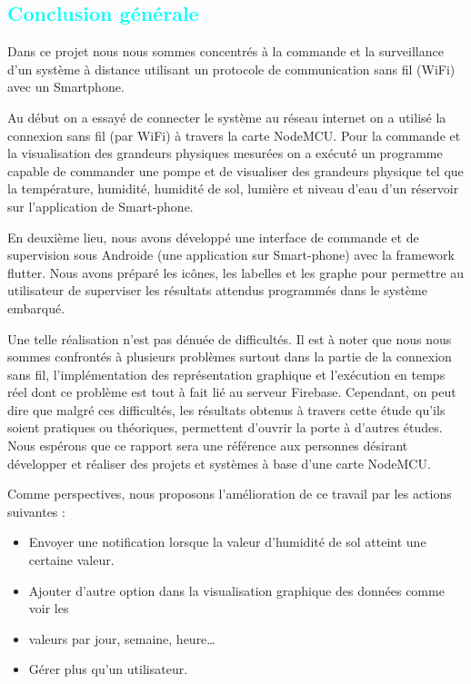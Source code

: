 
\begin{flushleft}
	\section*{\textcolor{cyan}{Conclusion générale}}
	Dans ce projet nous nous sommes concentrés à la commande et la surveillance d'un système à distance utilisant un protocole de communication sans fil (WiFi) avec un Smartphone.\newline
	
	Au début on a essayé de connecter le système au réseau internet on a utilisé la connexion sans fil (par WiFi) à travers la carte NodeMCU. Pour la commande et la visualisation des grandeurs 
	physiques mesurées on a exécuté un programme capable de commander une pompe et de 
	visualiser des grandeurs physique tel que la température, humidité, humidité de sol, lumière et 
	niveau d’eau d’un réservoir sur l’application de Smart-phone.\newline
	
	En deuxième lieu, nous avons développé une interface de commande et de supervision sous Androide (une application sur Smart-phone) avec la framework flutter. Nous 
	avons préparé les icônes, les labelles et les graphe pour permettre au utilisateur de superviser 
	les résultats attendus programmés dans le système embarqué.\newline
	
	Une telle réalisation n’est pas dénuée de difficultés. Il est à noter que nous nous sommes 
	confrontés à plusieurs problèmes surtout dans la partie de la connexion sans fil, 
	l’implémentation des représentation graphique et l’exécution en temps réel dont ce problème 
	est tout à fait lié au serveur Firebase. Cependant, on peut dire que malgré ces difficultés, les 
	résultats obtenus à travers cette étude qu’ils soient pratiques ou théoriques, permettent d’ouvrir 
	la porte à d’autres études. Nous espérons que ce rapport sera une référence aux personnes 
	désirant développer et réaliser des projets et systèmes à base d’une carte NodeMCU.\newline
	
	Comme perspectives, nous proposons l’amélioration de ce travail par les actions suivantes :\newline
	
	\begin{itemize}
		\item Envoyer une notification lorsque la valeur d’humidité de sol atteint une certaine valeur.
	\end{itemize}
	\begin{itemize}
		\item Ajouter d’autre option dans la visualisation graphique des données comme voir les 
		\item 	valeurs par jour, semaine, heure…
	\end{itemize}
	\begin{itemize}
		\item Gérer plus qu’un utilisateur.
	\end{itemize}
	
\end{flushleft}

\newpage

